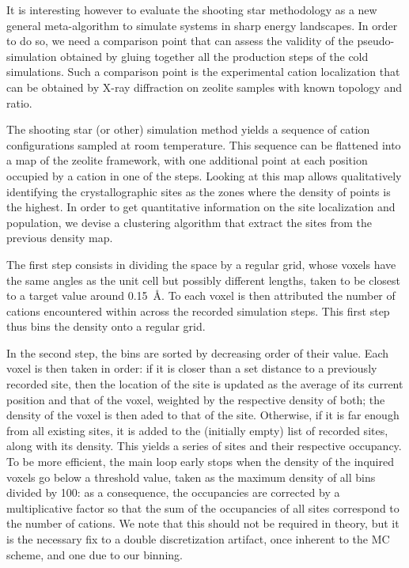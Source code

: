 \documentclass[main.tex]{subfiles}
\begin{document}
It is interesting however to evaluate the shooting star methodology as a new general meta-algorithm to simulate systems in sharp energy landscapes. In order to do so, we need a comparison point that can assess the validity of the pseudo-simulation obtained by gluing together all the production steps of the cold simulations. Such a comparison point is the experimental cation localization that can be obtained by X-ray diffraction on zeolite samples with known topology and \SiAl ratio.

The shooting star (or other) simulation method yields a sequence of cation configurations sampled at room temperature. This sequence can be flattened into a map of the zeolite framework, with one additional point at each position occupied by a cation in one of the steps. Looking at this map allows qualitatively identifying the crystallographic sites as the zones where the density of points is the highest. In order to get quantitative information on the site localization and population, we devise a clustering algorithm that extract the sites from the previous density map.

The first step consists in dividing the space by a regular grid, whose voxels have the same angles as the unit cell but possibly different lengths, taken to be closest to a target value around \qty{0.15}{\angstrom}. To each voxel is then attributed the number of cations encountered within across the recorded simulation steps. This first step thus bins the density onto a regular grid.

In the second step, the bins are sorted by decreasing order of their value. Each voxel is then taken in order: if it is closer than a set distance to a previously recorded site, then the location of the site is updated as the average of its current position and that of the voxel, weighted by the respective density of both; the density of the voxel is then aded to that of the site. Otherwise, if it is far enough from all existing sites, it is added to the (initially empty) list of recorded sites, along with its density. This yields a series of sites and their respective occupancy. To be more efficient, the main loop early stops when the density of the inquired voxels go below a threshold value, taken as the maximum density of all bins divided by 100: as a consequence, the occupancies are corrected by a multiplicative factor so that the sum of the occupancies of all sites correspond to the number of cations. We note that this should not be required in theory, but it is the necessary fix to a double discretization artifact, once inherent to the MC scheme, and one due to our binning.
\end{document}

